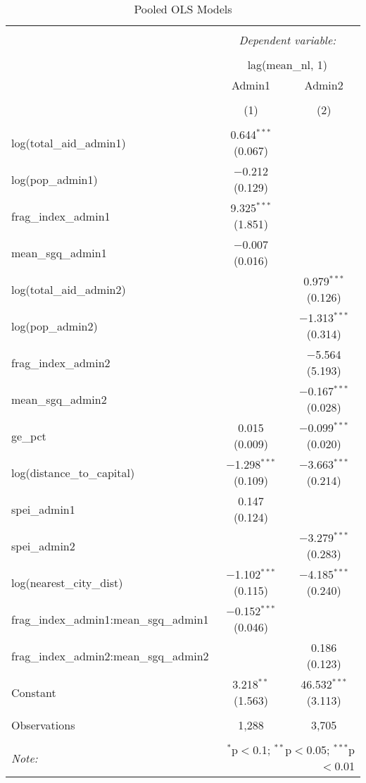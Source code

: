 
\begin{table}[!htbp] \centering 
  \caption{Pooled OLS Models} 
  \label{} 
\begin{tabular}{@{\extracolsep{5pt}}lcc} 
\\[-1.8ex]\hline 
\hline \\[-1.8ex] 
 & \multicolumn{2}{c}{\textit{Dependent variable:}} \\ 
\cline{2-3} 
\\[-1.8ex] & \multicolumn{2}{c}{lag(mean\_nl, 1)} \\ 
 & Admin1 & Admin2 \\ 
\\[-1.8ex] & (1) & (2)\\ 
\hline \\[-1.8ex] 
 log(total\_aid\_admin1) & 0.644$^{***}$ (0.067) &  \\ 
  log(pop\_admin1) & $-$0.212 (0.129) &  \\ 
  frag\_index\_admin1 & 9.325$^{***}$ (1.851) &  \\ 
  mean\_sgq\_admin1 & $-$0.007 (0.016) &  \\ 
  log(total\_aid\_admin2) &  & 0.979$^{***}$ (0.126) \\ 
  log(pop\_admin2) &  & $-$1.313$^{***}$ (0.314) \\ 
  frag\_index\_admin2 &  & $-$5.564 (5.193) \\ 
  mean\_sgq\_admin2 &  & $-$0.167$^{***}$ (0.028) \\ 
  ge\_pct & 0.015 (0.009) & $-$0.099$^{***}$ (0.020) \\ 
  log(distance\_to\_capital) & $-$1.298$^{***}$ (0.109) & $-$3.663$^{***}$ (0.214) \\ 
  spei\_admin1 & 0.147 (0.124) &  \\ 
  spei\_admin2 &  & $-$3.279$^{***}$ (0.283) \\ 
  log(nearest\_city\_dist) & $-$1.102$^{***}$ (0.115) & $-$4.185$^{***}$ (0.240) \\ 
  frag\_index\_admin1:mean\_sgq\_admin1 & $-$0.152$^{***}$ (0.046) &  \\ 
  frag\_index\_admin2:mean\_sgq\_admin2 &  & 0.186 (0.123) \\ 
  Constant & 3.218$^{**}$ (1.563) & 46.532$^{***}$ (3.113) \\ 
 \hline \\[-1.8ex] 
Observations & 1,288 & 3,705 \\ 
\hline 
\hline \\[-1.8ex] 
\textit{Note:}  & \multicolumn{2}{r}{$^{*}$p$<$0.1; $^{**}$p$<$0.05; $^{***}$p$<$0.01} \\ 
\end{tabular} 
\end{table} 

